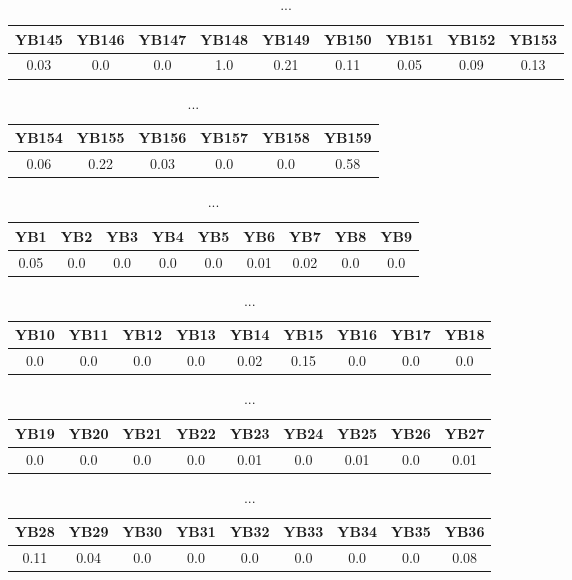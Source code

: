 \documentclass[]{article}
\begin{document}
\begin{table}[h]
	\centering
	\begin{tabular}{|c|c|c|c|c|c|c|c|c|}
		\hline
		YB145 & YB146 & YB147 & YB148 & YB149 & YB150 & YB151 & YB152 & YB153 \\
		\hline
		0.03  & 0.0   & 0.0   & 1.0   & 0.21  & 0.11  & 0.05  & 0.09  & 0.13  \\
		\hline
	\end{tabular}
	\caption{...}
\end{table}
\begin{table}[h]
	\centering
	\begin{tabular}{|c|c|c|c|c|c|}
		\hline
		YB154 & YB155 & YB156 & YB157 & YB158 & YB159 \\
		\hline
		0.06  & 0.22  & 0.03  & 0.0   & 0.0   & 0.58  \\
		\hline
	\end{tabular}
	\caption{...}
\end{table}
\begin{table}[h]
	\centering
	\begin{tabular}{|c|c|c|c|c|c|c|c|c|}
		\hline
		YB1  & YB2 & YB3 & YB4 & YB5 & YB6  & YB7  & YB8 & YB9 \\
		\hline
		0.05 & 0.0 & 0.0 & 0.0 & 0.0 & 0.01 & 0.02 & 0.0 & 0.0 \\
		\hline
	\end{tabular}
	\caption{...}
\end{table}
\begin{table}[h]
	\centering
	\begin{tabular}{|c|c|c|c|c|c|c|c|c|}
		\hline
		YB10 & YB11 & YB12 & YB13 & YB14 & YB15 & YB16 & YB17 & YB18 \\
		\hline
		0.0  & 0.0  & 0.0  & 0.0  & 0.02 & 0.15 & 0.0  & 0.0  & 0.0  \\
		\hline
	\end{tabular}
	\caption{...}
\end{table}
\begin{table}[h]
	\centering
	\begin{tabular}{|c|c|c|c|c|c|c|c|c|}
		\hline
		YB19 & YB20 & YB21 & YB22 & YB23 & YB24 & YB25 & YB26 & YB27 \\
		\hline
		0.0  & 0.0  & 0.0  & 0.0  & 0.01 & 0.0  & 0.01 & 0.0  & 0.01 \\
		\hline
	\end{tabular}
	\caption{...}
\end{table}
\begin{table}[h]
	\centering
	\begin{tabular}{|c|c|c|c|c|c|c|c|c|}
		\hline
		YB28 & YB29 & YB30 & YB31 & YB32 & YB33 & YB34 & YB35 & YB36 \\
		\hline
		0.11 & 0.04 & 0.0  & 0.0  & 0.0  & 0.0  & 0.0  & 0.0  & 0.08 \\
		\hline
	\end{tabular}
	\caption{...}
\end{table}
\end{document}
